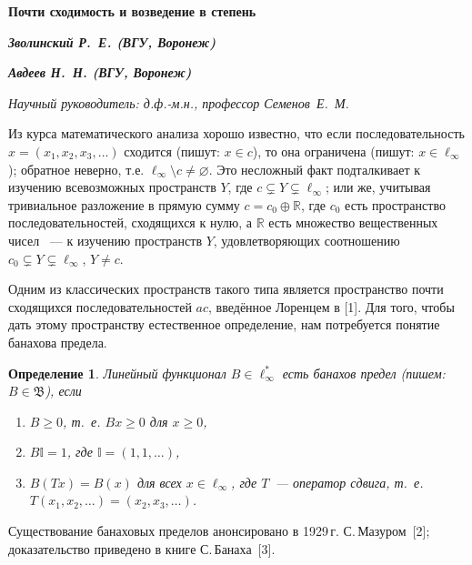 \documentclass[14pt, a4paper]{extbook}
\newtheorem{definition}{Определение}
\begin{document}
\begin{center}%
\textbf{\large{} Почти сходимость и возведение в степень} %

\textit{\textbf{Зволинский Р.~Е. (ВГУ, Воронеж)}} %

\textit{\textbf{Авдеев Н.~Н. (ВГУ, Воронеж)}} %

\textit{Научный руководитель: д.ф.-м.н., профессор Семенов~Е.~М.} %
\end{center}


Из курса математического анализа хорошо известно,
что если последовательность $x=(x_1, x_2, x_3, ...)$ сходится
(пишут: $x\in c$), то она ограничена (пишут: $x\in \ell_\infty$);
обратное неверно, т.е. $\ell_\infty\setminus c \ne \varnothing$.
Это несложный факт подталкивает к изучению всевозможных пространств $Y$, где $c \subsetneq Y \subsetneq \ell_\infty$;
или же, учитывая тривиальное разложение в прямую сумму $c=c_0 \oplus \mathbb R$,
где $c_0$ есть пространство последовательностей, сходящихся к нулю,
а $\mathbb R$ есть множество вещественных чисел ~---
к изучению пространств $Y$, удовлетворяющих соотношению $c_0 \subsetneq Y \subsetneq \ell_\infty$, $Y\ne c$.

Одним из классических пространств такого типа является пространство почти сходящихся последовательностей $ac$,
введённое Лоренцем в [1].
Для того, чтобы дать этому пространству естественное определение, нам потребуется понятие банахова предела.

\begin{definition}
	Линейный функционал $B\in \ell_\infty^*$ есть банахов предел (пишем: $B \in \mathfrak{B}$),
	если
	\begin{enumerate}
		\item
			$B\geq0$, т.~е. $Bx \geq 0$ для $x \geq 0$,
		\item
			$B\mathbb{I}=1$, где $\mathbb{I} =(1,1,\ldots)$,
		\item
			$B(Tx)=B(x)$ для всех $x\in \ell_\infty$, где $T$~---
			оператор сдвига, т.~е. $T(x_1,x_2,\ldots)=(x_2,x_3,\ldots)$.
	\end{enumerate}
\end{definition}

Существование банаховых пределов анонсировано в 1929\,г. С.\,Мазуром~[2];
доказательство приведено в книге С.\,Банаха~[3].
\end{document}
